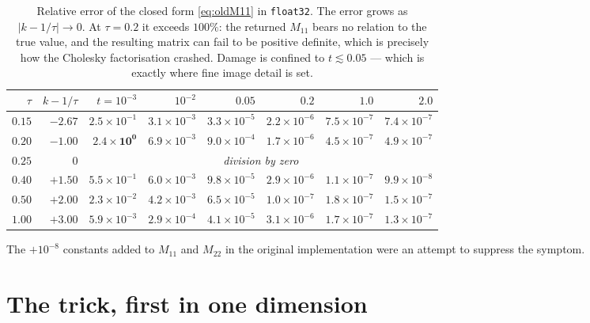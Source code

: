\documentclass[11pt]{article}
\newcommand{\kk}{k}
\newcommand{\tauu}{\tau}
\begin{document}
\begin{table}[h]
\centering\small\setlength{\tabcolsep}{4.2pt}
\begin{tabular}{rr rrrrrr}
\toprule
$\tauu$ & $\kk-1/\tauu$ & $t=10^{-3}$ & $10^{-2}$ & $0.05$ & $0.2$ & $1.0$ & $2.0$\\
\midrule
$0.15$ & $-2.67$ & $2.5\times10^{-1}$ & $3.1\times10^{-3}$ & $3.3\times10^{-5}$ & $2.2\times10^{-6}$ & $7.5\times10^{-7}$ & $7.4\times10^{-7}$\\
$0.20$ & $-1.00$ & $\mathbf{2.4\times10^{0}}$ & $6.9\times10^{-3}$ & $9.0\times10^{-4}$ & $1.7\times10^{-6}$ & $4.5\times10^{-7}$ & $4.9\times10^{-7}$\\
$0.25$ & $0$ & \multicolumn{6}{c}{\emph{division by zero}}\\
$0.40$ & $+1.50$ & $5.5\times10^{-1}$ & $6.0\times10^{-3}$ & $9.8\times10^{-5}$ & $2.9\times10^{-6}$ & $1.1\times10^{-7}$ & $9.9\times10^{-8}$\\
$0.50$ & $+2.00$ & $2.3\times10^{-2}$ & $4.2\times10^{-3}$ & $6.5\times10^{-5}$ & $1.0\times10^{-7}$ & $1.8\times10^{-7}$ & $1.5\times10^{-7}$\\
$1.00$ & $+3.00$ & $5.9\times10^{-3}$ & $2.9\times10^{-4}$ & $4.1\times10^{-5}$ & $3.1\times10^{-6}$ & $1.7\times10^{-7}$ & $1.3\times10^{-7}$\\
\bottomrule
\end{tabular}
\caption{Relative error of the closed form \eqref{eq:oldM11} in \texttt{float32}.
The error grows as $|\kk-1/\tauu|\to0$. At $\tauu=0.2$ it exceeds $100\%$: the returned
$M_{11}$ bears no relation to the true value, and the resulting matrix can fail to be
positive definite, which is precisely how the Cholesky factorisation crashed. Damage is
confined to $t\lesssim0.05$ --- which is exactly where fine image detail is set.}
\label{tab:err}
\end{table}

The $+10^{-8}$ constants added to $M_{11}$ and $M_{22}$ in the original implementation were
an attempt to suppress the symptom.

\section{The trick, first in one dimension}
\end{document}
